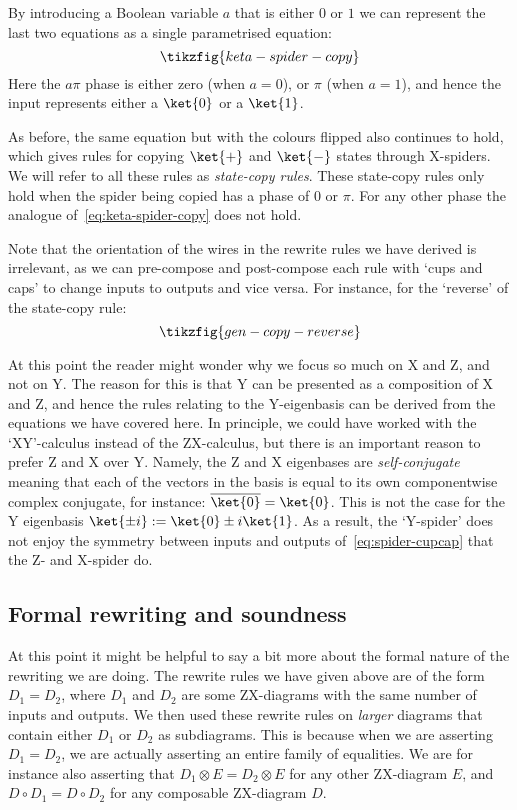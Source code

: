 \documentclass[a4paper,onecolumn,superscriptaddress,11pt,%
				unpublished,%
				allowfontchageintitle,%
				]{quantumarticle}
\begin{document}
By introducing a Boolean variable $a$ that is either $0$ or $1$ we can represent the last two equations as a single parametrised equation:
\begin{equation}\label{eq:keta-spider-copy}
\tikzfig{keta-spider-copy}
\end{equation}
Here the $a\pi$ phase is either zero (when $a=0$), or $\pi$ (when $a=1$), and hence the input represents either a $\ket{0}$ or a $\ket{1}$.

As before, the same equation but with the colours flipped also continues to hold, which gives rules for copying $\ket{+}$ and $\ket{-}$ states through X-spiders. We will refer to all these rules as \emph{state-copy rules}. These state-copy rules only hold when the spider being copied has a phase of $0$ or $\pi$. For any other phase the analogue of~\eqref{eq:keta-spider-copy} does not hold.

Note that the orientation of the wires in the rewrite rules we have derived is irrelevant, as we can pre-compose and post-compose each rule with `cups and caps' to change inputs to outputs and vice versa. For instance, for the `reverse' of the state-copy rule:
\begin{equation}
\tikzfig{gen-copy-reverse}
\end{equation}

At this point the reader might wonder why we focus so much on X and Z, and not on Y. The reason for this is that Y can be presented as a composition of X and Z, and hence the rules relating to the Y-eigenbasis can be derived from the equations we have covered here. In principle, we could have worked with the `XY'-calculus instead of the ZX-calculus, but there is an important reason to prefer Z and X over Y. 
Namely, the Z and X eigenbases are \emph{self-conjugate} meaning that each of the vectors in the basis is equal to its own componentwise complex conjugate, for instance: $\overline{\ket{0}} = \ket{0}$. 
This is not the case for the Y eigenbasis $\ket{\pm i} := \ket{0} \pm i\ket{1}$. As a result, the `Y-spider' does not enjoy the symmetry between inputs and outputs of~\eqref{eq:spider-cupcap} that the Z- and X-spider do.


\subsection{Formal rewriting and soundness}
At this point it might be helpful to say a bit more about the formal nature of the rewriting we are doing.
The rewrite rules we have given above are of the form $D_1=D_2$, where $D_1$ and $D_2$ are some ZX-diagrams with the same number of inputs and outputs.
We then used these rewrite rules on \emph{larger} diagrams that contain either $D_1$ or $D_2$ as subdiagrams. This is because when we are asserting $D_1=D_2$, we are actually asserting an entire family of equalities. We are for instance also asserting that $D_1\otimes E = D_2\otimes E$ for any other ZX-diagram $E$, and $D\circ D_1 = D\circ D_2$ for any composable ZX-diagram $D$. 
\end{document}
